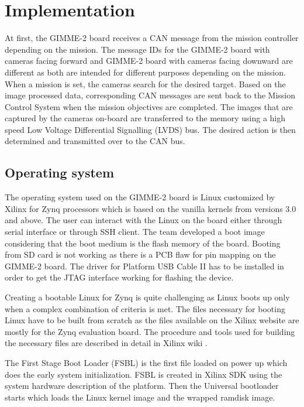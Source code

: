 \section{Implementation}\label{sec:implementation}
At first, the GIMME-2 board receives a CAN message from the mission controller depending on the mission. The message IDs for the GIMME-2 board with cameras facing forward and GIMME-2 board with cameras facing downward are different as both are intended for different purposes depending on the mission. When a mission is set, the cameras search for the desired target. Based on the image processed data, corresponding CAN messages are sent back to the Mission Control System when the mission objectives are completed. The images that are captured by the cameras on-board are transferred to the memory using a high speed Low Voltage Differential Signalling (LVDS) bus. The desired action is then determined and transmitted over to the CAN bus.

\subsection{Operating system}
The operating system used on the GIMME-2 board is Linux customized by Xilinx for Zynq processors which is based on the vanilla kernels from versions 3.0 and above. The user can interact with the Linux on the board either through serial interface or through SSH client. The team developed a boot image considering that the boot medium is the flash memory of the board. Booting from SD card is not working as there is a PCB flaw for pin mapping on the GIMME-2 board. The driver for Platform USB Cable II has to be installed in order to get the JTAG interface working for flashing the device.

Creating a bootable Linux for Zynq is quite challenging as Linux boots up only when a complex combination of criteria is met. The files necessary for booting Linux have to be built from scratch as the files available on the Xilinx website are mostly for the Zynq evaluation board. The procedure and tools used for building the necessary files are described in detail in Xilinx wiki \cite{XilinxWiki}. 

The First Stage Boot Loader (FSBL) is the first file loaded on power up which does the early system initialization. FSBL is created in Xilinx SDK using the system hardware description of the platform. Then the Universal bootloader starts which loads the Linux kernel image and the wrapped ramdisk image.


